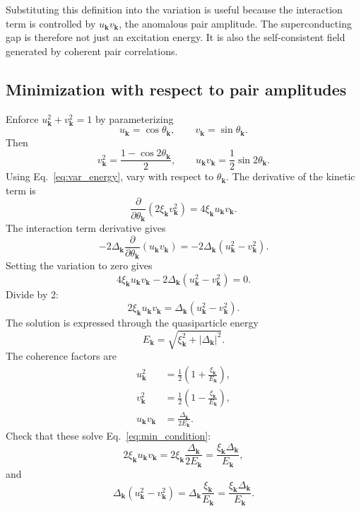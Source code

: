 \documentclass[11pt]{article}
\numberwithin{equation}{section}
\newcommand{\kvec}{\bm{k}}
\begin{document}
Substituting this definition into the variation is useful because the interaction term is controlled by $u_{\kvec} v_{\kvec}$, the anomalous pair amplitude. The superconducting gap is therefore not just an excitation energy. It is also the self-consistent field generated by coherent pair correlations.

\subsection{Minimization with respect to pair amplitudes}

Enforce $u_{\kvec}^2+v_{\kvec}^2=1$ by parameterizing
\begin{equation}
u_{\kvec}=\cos\theta_{\kvec},
\qquad
v_{\kvec}=\sin\theta_{\kvec}.
\end{equation}
Then
\begin{equation}
v_{\kvec}^2=\frac{1-\cos 2\theta_{\kvec}}{2},
\qquad
u_{\kvec} v_{\kvec}=\frac{1}{2}\sin 2\theta_{\kvec}.
\end{equation}
Using Eq.~\eqref{eq:var_energy}, vary with respect to $\theta_{\kvec}$. The derivative of the kinetic term is
\begin{equation}
\frac{\partial}{\partial\theta_{\kvec}}\left(2\xi_{\kvec} v_{\kvec}^2\right)=4\xi_{\kvec} u_{\kvec} v_{\kvec}.
\end{equation}
The interaction term derivative gives
\begin{equation}
-2\Delta_{\kvec}\frac{\partial}{\partial\theta_{\kvec}}(u_{\kvec} v_{\kvec})
=-2\Delta_{\kvec}(u_{\kvec}^2-v_{\kvec}^2).
\end{equation}
Setting the variation to zero gives
\begin{equation}
4\xi_{\kvec} u_{\kvec} v_{\kvec}-2\Delta_{\kvec}(u_{\kvec}^2-v_{\kvec}^2)=0.
\end{equation}
Divide by 2:
\begin{equation}
2\xi_{\kvec} u_{\kvec} v_{\kvec}=\Delta_{\kvec}(u_{\kvec}^2-v_{\kvec}^2).
\label{eq:min_condition}
\end{equation}
The solution is expressed through the quasiparticle energy
\begin{equation}
E_{\kvec}=\sqrt{\xi_{\kvec}^2+|\Delta_{\kvec}|^2}.
\end{equation}
The coherence factors are
\begin{align}
u_{\kvec}^2&=\frac{1}{2}\left(1+\frac{\xi_{\kvec}}{E_{\kvec}}\right),\\
v_{\kvec}^2&=\frac{1}{2}\left(1-\frac{\xi_{\kvec}}{E_{\kvec}}\right),\\
u_{\kvec} v_{\kvec}&=\frac{\Delta_{\kvec}}{2E_{\kvec}}.
\end{align}
Check that these solve Eq.~\eqref{eq:min_condition}:
\begin{equation}
2\xi_{\kvec} u_{\kvec} v_{\kvec}=2\xi_{\kvec}\frac{\Delta_{\kvec}}{2E_{\kvec}}=\frac{\xi_{\kvec}\Delta_{\kvec}}{E_{\kvec}},
\end{equation}
and
\begin{equation}
\Delta_{\kvec}(u_{\kvec}^2-v_{\kvec}^2)=\Delta_{\kvec}\frac{\xi_{\kvec}}{E_{\kvec}}=\frac{\xi_{\kvec}\Delta_{\kvec}}{E_{\kvec}}.
\end{equation}
\end{document}
